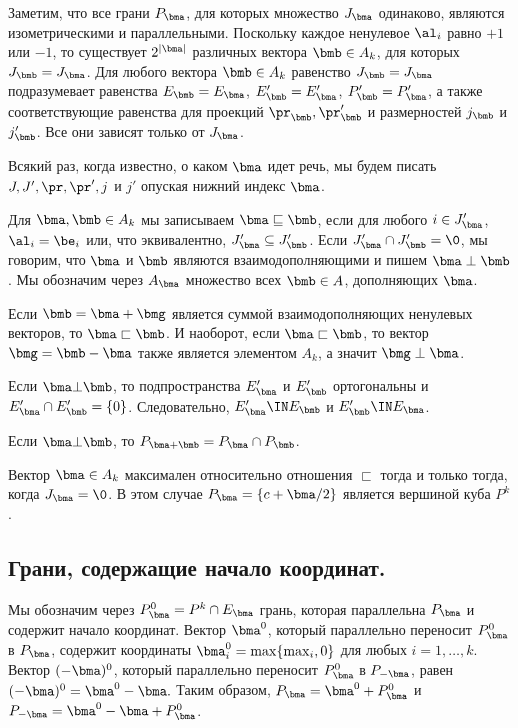 Заметим, что все грани $P_\bma$, для которых множество $J_\bma$ одинаково, являются изометрическими и параллельными.
Поскольку каждое ненулевое $\al_i$ равно $+1$ или $-1$, то существует $2^{|\bma|}$ различных вектора $\bmb\in A_k$, для которых $J_\bmb=J_\bma$.
Для любого вектора $\bmb\in A_k$ равенство $J_\bmb=J_\bma$ подразумевает равенства $E_\bmb=E_\bma$, $E'_\bmb=E'_\bma$, $P'_\bmb=P'_\bma$, а также соответствующие равенства для проекций $\pr_\bmb, \pr'_\bmb$ и размерностей $j_\bmb$ и $j'_\bmb$.
Все они зависят только от $J_\bma$.
 

Всякий раз, когда известно, о каком $\bma$ идет речь, мы будем писать $J, J', \pr, \pr', j$ и $j'$ опуская нижний индекс $\bma$.
 
\begin{definition}\label{INperp}
Для $\bma,\bmb\in A_k$ мы записываем $\bma\sqsubseteq\bmb$, если для любого $i\in J'_\bma$, $\al_i=\be_i$ или, что эквивалентно, $J'_\bma\subseteq J'_\bmb$.
Если $J'_\bma\cap J'_\bmb=\0$, мы говорим, что $\bma$ и $\bmb$ являются взаимодополняющими и пишем $\bma\perp\bmb$.
Мы обозначим через $A_\bma$ множество всех $\bmb\in A$, дополняющих $\bma$.
\end{definition}

Если $\bmb=\bma+\bmg$ является суммой взаимодополняющих ненулевых векторов, то $\bma\sqsubset\bmb$.
И наоборот, если $\bma\sqsubset\bmb$, то вектор $\bmg=\bmb-\bma$ также является элементом $A_k$, а значит $\bmg\perp\bma$.


Если $\bma\bot\bmb$, то подпространства $E'_\bma$ и $E'_\bmb$ ортогональны и $E'_\bma\cap E'_\bmb =\{0\}$. 
Следовательно, $E'_\bma\IN E_\bmb$ и $E'_\bmb\IN E_\bma$.

Если $\bma\bot\bmb$, то $P_{\bma+\bmb}=P_\bma\cap P_\bmb$.

Вектор $\bma\in A_k$ максимален относительно отношения $\sqsubset$ тогда и только тогда, когда $J_\bma=\0$. 
В этом случае $P_\bma=\{c+\bma/2\}$ является вершиной куба $P^k$.


 
\subsection{Грани, содержащие начало координат.}  
Мы обозначим через $P^0_{\bma}=P^k\cap E_\bma$ грань, которая параллельна $P_\bma$ и содержит начало координат.
Вектор  $\bma^0$, который параллельно переносит $P^0_{\bma}$ в $P_\bma$, содержит координаты $\bma_i^0=\max\{\max_i,0\}$ для любых $i=1,\ldots,k$.
Вектор $(-\bma)^0$, который параллельно переносит $P^0_{\bma}$ в $P_{-\bma}$, равен $(-\bma)^0=\bma^0-\bma.$
Таким образом, $P_\bma=\bma^0 +P^0_{\bma}$ и $P_{-\bma}=\bma^0-\bma+P^0_{\bma}$.

